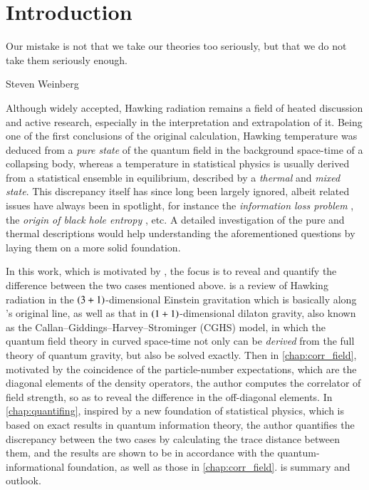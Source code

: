 \chapter{Introduction}
\label{sec:intro}

\epigraph{Our mistake is not that we take our theories too seriously, but that 
we do not take them seriously enough.}{Steven Weinberg 
\cite{Weinberg1993first}}

Although widely accepted, Hawking radiation remains a field of heated 
discussion and active research, especially in the interpretation and 
extrapolation of it. Being one of the first conclusions of the original 
calculation, Hawking temperature was deduced from a \emph{pure state} of the 
quantum field in the background space-time of a collapsing body, whereas a 
temperature in statistical physics is usually derived from a statistical 
ensemble in equilibrium, described by a \emph{thermal} and \emph{mixed state}. 
This discrepancy itself has since long been largely ignored, albeit related 
issues have always been in spotlight, for instance the \emph{information loss 
problem} , the \emph{origin of black hole entropy} \cite{Mann2015,Harlow2016}, 
etc. A detailed investigation of the pure and thermal descriptions would help 
understanding the aforementioned questions by laying them on a more solid 
foundation.

In this work, which is motivated by \cite{Kiefer2001,Hsu2009}, the focus is to 
reveal and quantify the difference between the two cases mentioned above. 
 is a review of Hawking radiation in the 
${\left(3+1\right)}$-dimensional Einstein gravitation which is basically along 
\citeauthor{Hawking1976}'s original line, as well as that in 
${\left(1+1\right)}$-dimensional dilaton gravity, also known as the  
Callan--Giddings--Harvey--Strominger (CGHS) model, in which the quantum field 
theory in curved space-time not only can be \emph{derived} from the full theory 
of quantum gravity, but also be solved exactly. Then in \cref{chap:corr_field}, 
motivated by the coincidence of the particle-number expectations, which are the 
diagonal elements of the density operators, the author computes the correlator 
of field strength, so as to reveal the difference in the off-diagonal elements. 
In \cref{chap:quantifing}, inspired by a new foundation of statistical physics, 
which is based on exact results in quantum information theory, the author 
quantifies the discrepancy between the two cases by calculating the trace 
distance between them, and the results are shown to be in accordance with the 
quantum-informational foundation, as well as those in \cref{chap:corr_field}. 
 is summary and outlook.

